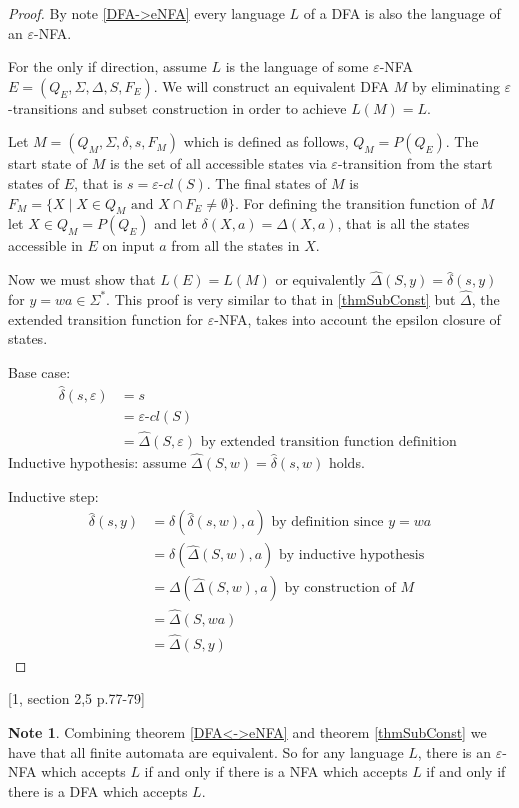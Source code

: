 \documentclass[a4paper,12pt]{report}
\theoremstyle{definition}
\newtheorem{note}{Note}[subsection]
\begin{document}
\begin{proof}
By note \ref{DFA->eNFA} every language $L$ of a DFA is also the language of an $\varepsilon$-NFA.

For the only if direction, assume $L$ is the language of some $\varepsilon$-NFA $E=(Q_E,\Sigma,\Delta, S, F_E)$. We will construct an equivalent DFA $M$ by eliminating $\varepsilon$-transitions and subset construction in order to achieve $L(M)=L$.

Let $M=(Q_M,\Sigma, \delta, s, F_M)$ which is defined as follows, $Q_M=P(Q_E)$. The start state of $M$ is the set of all accessible states via $\varepsilon$-transition from the start states of $E$, that is $s=\varepsilon$-$cl(S)$. The final states of $M$ is $F_M=\{X \mid X\in Q_M \text{ and } X\cap F_E \neq\emptyset \} $.  For defining the transition function of $M$ let $X\in Q_M=P(Q_E)$ and let $\delta(X,a)=\Delta(X,a) $, that is all the states accessible in $E$ on input $a$ from all the states in $X$.

Now we must show that $L(E)=L(M)$ or equivalently $\hat{\Delta}(S, y)=\hat{\delta}(s,y)$ for $y=wa\in\Sigma^*$. This proof is very similar to that in \ref{thmSubConst} but $\hat{\Delta}$, the extended transition function for $\varepsilon$-NFA, takes into account the epsilon closure of states.

Base case: \begin{align*}
\hat{\delta}(s,\varepsilon)&=s\\
&=\varepsilon\text{-}cl(S)\\
&=\hat{\Delta}(S,\varepsilon) \text{ by extended transition function definition } 
\end{align*}
Inductive hypothesis: assume $\hat{\Delta}(S, w)=\hat{\delta}(s,w)$ holds.

Inductive step: 
\begin{align*}
\hat{\delta}(s,y) &=\delta(\hat{\delta}(s,w),a) \text{ by definition since } y=wa\\
&=\delta(\hat{\Delta}(S,w),a) \text{ by inductive hypothesis } \\
&=\Delta(\hat{\Delta}(S,w),a) \text{ by construction of }M\\ 
&=\hat{\Delta}(S,wa)\\
&=\hat{\Delta}(S,y)
\end{align*}
\end{proof}
[1, section 2,5 p.77-79]

\begin{note}
\label{FiniteEquivalence}
Combining theorem \ref{DFA<->eNFA} and theorem \ref{thmSubConst} we have that all finite automata are equivalent. So for any language $L$, there is an $\varepsilon$-NFA which accepts $L$ if and only if there is a NFA which accepts $L$ if and only if there is a DFA which accepts $L$.
\end{note}
\end{document}
